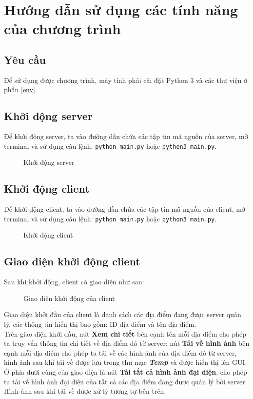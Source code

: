 \section{Hướng dẫn sử dụng các tính năng của chương trình}

\subsection{Yêu cầu}
Để sử dụng được chương trình, máy tính phải cài đặt Python 3 và các thư viện ở phần \ref{env}.

\subsection{Khởi động server}
Để khởi động server, ta vào đường dẫn chứa các tập tin mã nguồn của server, mở terminal và sử dụng câu lệnh: \lstinline[language=bash]{python main.py} hoặc \lstinline[language=bash]{python3 main.py}.
\begin{figure}[H]
\caption{Khởi động server}
\end{figure}

\subsection{Khởi động client}
Để khởi động client, ta vào đường dẫn chứa các tập tin mã nguồn của client, mở terminal và sử dụng câu lệnh: \lstinline[language=bash]{python main.py} hoặc \lstinline[language=bash]{python3 main.py}.
\begin{figure}[H]
\caption{Khởi động client}
\end{figure}

\subsection{Giao diện khởi động client}
Sau khi khởi động, client có giao diện như sau:
\begin{figure}[H]
\caption{Giao diện khởi động của client}
\end{figure}
Giao diện khởi đầu của client là danh sách các địa điểm đang được server quản lý, các thông tin hiển thị bao gồm: ID địa điểm và tên địa điểm.\\
Trên giao diện khởi đầu, nút \textbf{Xem chi tiết} bên cạnh tên mỗi địa điểm cho phép ta truy vấn thông tin chi tiết về địa điểm đó từ server; nút \textbf{Tải về hình ảnh} bên cạnh mỗi địa điểm cho phép ta tải về các hình ảnh của địa điểm đó từ server, hình ảnh sau khi tải về được lưu trong thư mục \textbf{\textit{Temp}} và được hiển thị lên GUI.\\
Ở phía dưới cùng của giao diện là nút \textbf{Tải tất cả hình ảnh đại diện}, cho phép ta tải về hình ảnh đại diện của tất cả các địa điểm đang được quản lý bởi server. Hình ảnh sau khi tải về được xử lý tương tự bên trên.

